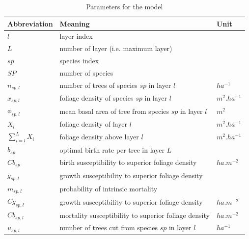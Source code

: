 \documentclass{article}
\begin{document}
\begin{table}[t]
    \centering
    \begin{tabular}{l l l}
    \hline
    \hline
    \textbf{Abbreviation} & \textbf{Meaning} & \textbf{Unit} \\
    \hline
    \hline
    $l$            & layer index                                                 &          \\
    $L$            & number of layer (i.e. maximum layer)                        &          \\
    $sp$           & species index                                               &          \\
    $SP$           & number of species                                           &            \\
    $n_{sp,l}$     & number of trees of species $sp$ in layer $l$                & $ha^{-1}$  \\    
    $x_{sp,l}$     & foliage density of species $sp$ in layer $l$                & $m^2.ha^{-1}$  \\
    $\phi_{sp,l}$     & mean basal area of tree from species $sp$ in layer $l$    & $m^2$  \\
    $X_{l}$        & foliage density of layer $l$                                & $m^2.ha^{-1}$  \\ 
    $\sum_{i = l}^{L} X_{i}$     & foliage density above layer $l$      & $m^2.ha^{-1}$  \\ 
    $b_{sp}$       & optimal birth rate per tree in layer $L$    &  \\
    $Cb_{sp}$      & birth susceptibility to superior foliage density    & $ha.m^{-2}$           \\
    $g_{sp,l}$     & growth susceptibility to superior foliage density           &  \\
    $m_{sp,l}$     & probability of intrinsic mortality           & \\
    $Cg_{sp,l}$    & growth susceptibility to superior foliage density            &   $ha.m^{-2}$  \\
    $Cb_{sp,l}$    & mortality susceptibility to superior foliage density            & $ha.m^{-2}$    \\
    $u_{sp,l}$     & number of trees cut from species $sp$ in layer $l$           & $ha^{-1}$ \\
    \hline
    \hline
    \end{tabular}
    \caption{Parameters for the model}
    \label{tab:coef}
\end{table}
\end{document}

